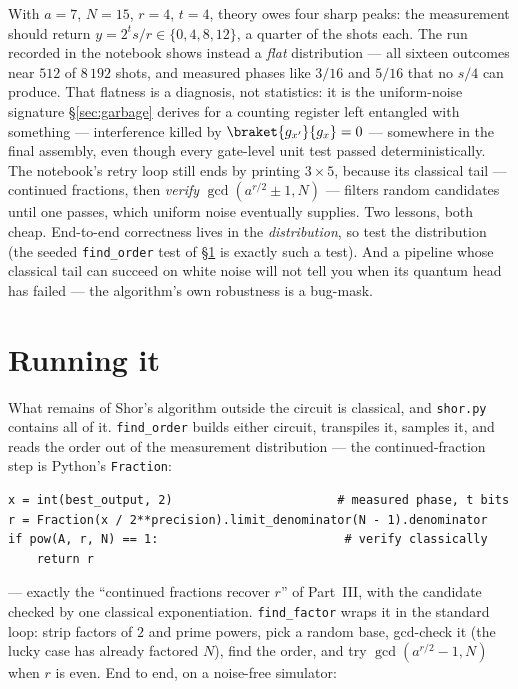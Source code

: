 \documentclass[11pt]{article}
\newcommand{\code}[1]{\texttt{#1}}
\theoremstyle{plain}
\theoremstyle{remark}
\begin{document}
\begin{warnbox}[title={Read the histogram, not the factors}]
With $a=7$, $N=15$, $r=4$, $t=4$, theory owes four sharp peaks: the measurement should return
$y=2^t s/r\in\{0,4,8,12\}$, a quarter of the shots each. The run recorded in the notebook shows
instead a \emph{flat} distribution --- all sixteen outcomes near $512$ of $8\,192$ shots, and
measured phases like $3/16$ and $5/16$ that no $s/4$ can produce. That flatness is a diagnosis,
not statistics: it is the uniform-noise signature \S\ref{sec:garbage} derives for a counting
register left entangled with something --- interference killed by $\braket{g_{x'}}{g_x}=0$ ---
somewhere in the final assembly, even though every gate-level unit test passed deterministically.
The notebook's retry loop still ends by printing $3\times5$, because its classical tail ---
continued fractions, then \emph{verify} $\gcd(a^{r/2}\pm1,N)$ --- filters random candidates until
one passes, which uniform noise eventually supplies. Two lessons, both cheap. End-to-end
correctness lives in the \emph{distribution}, so test the distribution (the seeded
\code{find\_order} test of \S\ref{sec:code-run} is exactly such a test). And a pipeline whose
classical tail can succeed on white noise will not tell you when its quantum head has failed ---
the algorithm's own robustness is a bug-mask.
\end{warnbox}

\section{Running it}\label{sec:code-run}

What remains of Shor's algorithm \cite{shor} outside the circuit is classical, and \code{shor.py}
contains all of it. \code{find\_order} builds either circuit, transpiles it, samples it, and reads
the order out of the measurement distribution --- the continued-fraction step is Python's
\code{Fraction}:

\begin{lstlisting}
x = int(best_output, 2)                       # measured phase, t bits
r = Fraction(x / 2**precision).limit_denominator(N - 1).denominator
if pow(A, r, N) == 1:                          # verify classically
    return r
\end{lstlisting}

\noindent
--- exactly the ``continued fractions recover $r$'' of Part~III, with the candidate checked by one
classical exponentiation. \code{find\_factor} wraps it in the standard loop: strip factors of $2$
and prime powers, pick a random base, gcd-check it (the lucky case has already factored $N$),
find the order, and try $\gcd(a^{r/2}-1,N)$ when $r$ is even. End to end, on a noise-free
simulator:
\end{document}
